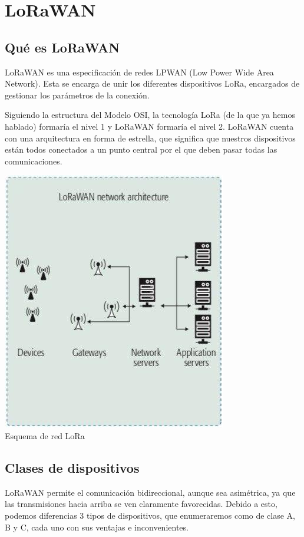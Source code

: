 \documentclass[11pt,a4paper]{article}
\begin{document}
\section{LoRaWAN}
\subsection{Qué es LoRaWAN}
LoRaWAN es una especificación de redes LPWAN (Low Power Wide Area Network). Esta se encarga de unir los diferentes dispositivos LoRa, encargados de gestionar los parámetros de la conexión.

\medskip

Siguiendo la estructura del Modelo OSI, la tecnología LoRa (de la que ya hemos hablado) formaría el nivel 1 y LoRaWAN formaría el nivel 2. LoRaWAN cuenta con una arquitectura en forma de estrella, que significa que nuestros dispositivos están todos conectados a un punto central por el que deben pasar todas las comunicaciones.

\begin{center}
\includegraphics[scale=0.7]{img/red.jpg} \\
\small{Esquema de red LoRa}
\end{center}

\subsection{Clases de dispositivos}
LoRaWAN permite el comunicación bidireccional, aunque sea asimétrica, ya que las transmisiones hacia arriba se ven claramente favorecidas. Debido a esto, podemos diferencias 3 tipos de dispositivos, que enumeraremos como de clase A, B y C, cada uno con sus ventajas e inconvenientes.
\end{document}
